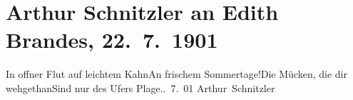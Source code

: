 

         
         \renewcommand{\erwaehntePersonen}{Personen: Georg Brandes, Edith Philipp}
         \renewcommand{\erwaehnteOrte}{Orte: Kopenhagen, Vahrn}
         \renewcommand{\erwaehnteWerke}{}
               \section[Arthur Schnitzler an Edith Brandes, 22. 7. 1901]{ Arthur Schnitzler an Edith Brandes, 22. 7. 1901}\nopagebreak{}\rehead{ }\begin{ledgroupsized}[t]{13cm}\normalsize\beginnumbering{} \toendnotes[C]{\smallbreak\pagebreak[2]} \stanza{}{\pb}In offner Flut auf leichtem Kahn\newverse{}An frischem Sommertage!\newverse{}Die Mücken, die dir wehgethan\newverse{}Sind nur des Ufers Plage.\stanzaend{}. 7. 01{ }\spacefill\mbox{Arthur Schnitzler}\pend{}
         
         \endnumbering{}\end{ledgroupsized}  \newcommand{\dateiname}{L01151}\newcommand{\titel}{Arthur Schnitzler an Edith Brandes, 22. 7. 1901}\newcommand{\editorInnen}{Martin Anton Müller und Gerd-Hermann Susen}
      